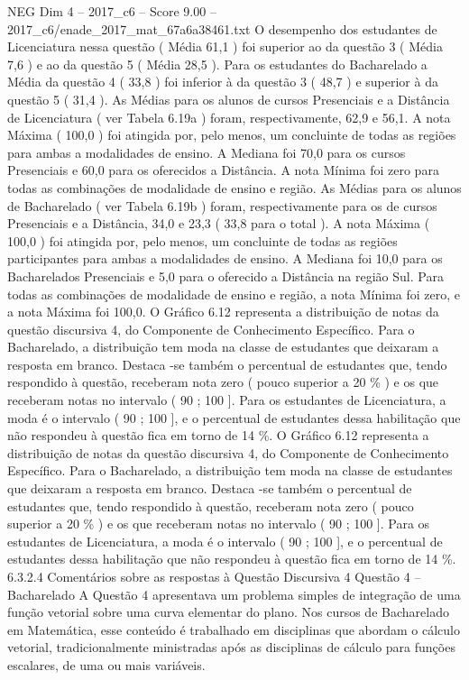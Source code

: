 \begin{textsample}{NEG Dim 4 – 2017\_c6 – Score 9.00 – 2017\_c6/enade\_2017\_mat\_67a6a38461.txt}
O desempenho dos estudantes de Licenciatura nessa questão ( Média 61,1 ) foi superior ao da questão 3 ( Média 7,6 ) e ao da questão 5 ( Média 28,5 ).
Para os estudantes do Bacharelado a Média da questão 4 ( 33,8 ) foi inferior à da questão 3 ( 48,7 ) e superior à da questão 5 ( 31,4 ).
As Médias para os alunos de cursos Presenciais e a Distância de Licenciatura ( ver Tabela 6.19a ) foram, respectivamente, 62,9 e 56,1.
A nota Máxima ( 100,0 ) foi atingida por, pelo menos, um concluinte de todas as regiões para ambas a modalidades de ensino.
A Mediana foi 70,0 para os cursos Presenciais e 60,0 para os oferecidos a Distância.
A nota Mínima foi zero para todas as combinações de modalidade de ensino e região.
As Médias para os alunos de Bacharelado ( ver Tabela 6.19b ) foram, respectivamente para os de cursos Presenciais e a Distância, 34,0 e 23,3 ( 33,8 para o total ).
A nota Máxima ( 100,0 ) foi atingida por, pelo menos, um concluinte de todas as regiões participantes para ambas a modalidades de ensino.
A Mediana foi 10,0 para os Bacharelados Presenciais e 5,0 para o oferecido a Distância na região Sul.
Para todas as combinações de modalidade de ensino e região, a nota Mínima foi zero, e a nota Máxima foi 100,0.
O Gráfico 6.12 representa a distribuição de notas da questão discursiva 4, do Componente de Conhecimento Específico.
Para o Bacharelado, a distribuição tem moda na classe de estudantes que deixaram a resposta em branco.
Destaca -se também o percentual de estudantes que, tendo respondido à questão, receberam nota zero ( pouco superior a 20 \% ) e os que receberam notas no intervalo ( 90 ; 100 ].
Para os estudantes de Licenciatura, a moda é o intervalo ( 90 ; 100 ], e o percentual de estudantes dessa habilitação que não respondeu à questão fica em torno de 14 \%.
O Gráfico 6.12 representa a distribuição de notas da questão discursiva 4, do Componente de Conhecimento Específico.
Para o Bacharelado, a distribuição tem moda na classe de estudantes que deixaram a resposta em branco.
Destaca -se também o percentual de estudantes que, tendo respondido à questão, receberam nota zero ( pouco superior a 20 \% ) e os que receberam notas no intervalo ( 90 ; 100 ].
Para os estudantes de Licenciatura, a moda é o intervalo ( 90 ; 100 ], e o percentual de estudantes dessa habilitação que não respondeu à questão fica em torno de 14 \%. 6.3.2.4 Comentários sobre as respostas à Questão Discursiva 4 Questão 4 – Bacharelado A Questão 4 apresentava um problema simples de integração de uma função vetorial sobre uma curva elementar do plano.
Nos cursos de Bacharelado em Matemática, esse conteúdo é trabalhado em disciplinas que abordam o cálculo vetorial, tradicionalmente ministradas após as disciplinas de cálculo para funções escalares, de uma ou mais variáveis.

\end{textsample}
